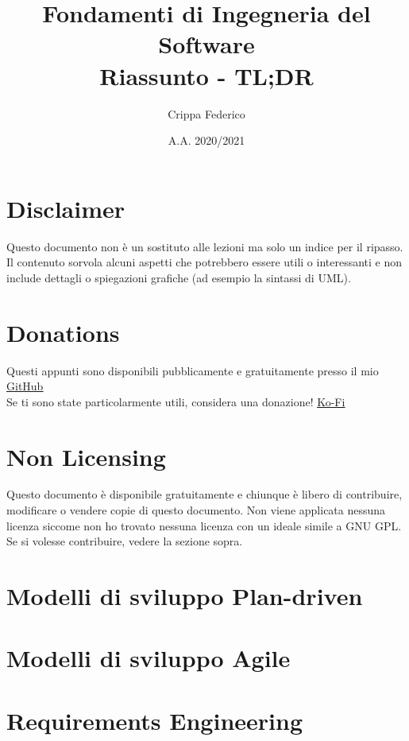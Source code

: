 \documentclass[10pt]{article}
\title{Fondamenti di Ingegneria del Software\\ \large Riassunto - TL;DR}
\author{Crippa Federico}
\date{A.A. 2020/2021}
\begin{document}
\maketitle
\tableofcontents

\newpage
\section*{Disclaimer}
Questo documento non \`e un sostituto alle lezioni ma solo un indice per il ripasso. Il contenuto sorvola alcuni aspetti che potrebbero essere utili o interessanti e non include dettagli o spiegazioni grafiche (ad esempio la sintassi di UML).

\vspace{1in}
\section*{Donations} \label{sec:Donations}
Questi appunti sono disponibili pubblicamente e gratuitamente presso il mio \underline{\href{https://github.com/WolfenCLI/Database-class-notes}{GitHub}}\\
Se ti sono state particolarmente utili, considera una donazione! \underline{\href{https://ko-fi.com/wolfencli}{Ko-Fi}}

\vspace{1in}
\section*{Non Licensing}
Questo documento \`e disponibile gratuitamente e chiunque \`e libero di contribuire, modificare o vendere copie di questo documento. Non viene applicata nessuna licenza siccome non ho trovato nessuna licenza con un ideale simile a GNU GPL.\\
Se si volesse contribuire, vedere la sezione sopra.

\newpage
\section{Modelli di sviluppo Plan-driven}


\section{Modelli di sviluppo Agile}


\newpage
\section{Requirements Engineering}

\end{document}
